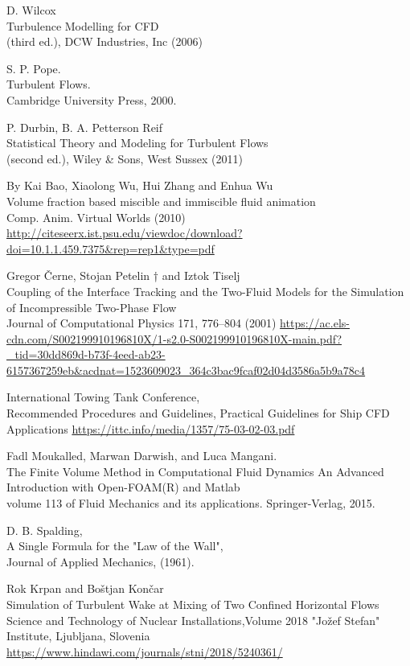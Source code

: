 \documentclass[a4paper, 12pt]{report}
\begin{document}
\begin{thebibliography}{9}
	 D. Wilcox\\
	 Turbulence Modelling for CFD\\
	(third ed.), DCW Industries, Inc (2006)
	
	S. P. Pope.\\
	Turbulent Flows.\\
	Cambridge University Press, 2000.

	 P. Durbin, B. A. Petterson Reif\\
	 Statistical Theory and Modeling for Turbulent Flows\\
	(second ed.), Wiley \& Sons, West Sussex (2011)
	
	By Kai Bao, Xiaolong Wu, Hui Zhang and Enhua Wu\\
	Volume fraction based miscible and immiscible fluid animation\\
	Comp. Anim. Virtual Worlds (2010)
	\url{http://citeseerx.ist.psu.edu/viewdoc/download?doi=10.1.1.459.7375&rep=rep1&type=pdf}
	
	Gregor Černe, Stojan Petelin † and Iztok Tiselj\\
	Coupling of the Interface Tracking and the Two-Fluid Models 		for the Simulation of Incompressible Two-Phase Flow\\
	Journal of Computational Physics 171, 776–804 (2001)
	\url{https://ac.els-cdn.com/S002199910196810X/1-s2.0-S002199910196810X-main.pdf?_tid=30dd869d-b73f-4eed-ab23-6157367259eb&acdnat=1523609023_364c3bac9fcaf02d04d3586a5b9a78c4}
	
	International Towing Tank Conference,\\
	Recommended Procedures and Guidelines, Practical Guidelines for Ship CFD Applications
	\url{https://ittc.info/media/1357/75-03-02-03.pdf}
	
	Fadl Moukalled, Marwan Darwish, and Luca Mangani.\\
	The Finite Volume Method in Computational Fluid Dynamics An Advanced Introduction with 	Open-FOAM(R) and Matlab\\
	volume 113 of Fluid Mechanics and its applications. Springer-Verlag, 2015.
	
	D. B. Spalding,\\
	A Single Formula for the "Law of the Wall",\\ 
	Journal of Applied Mechanics, (1961).
	
	Rok Krpan and Boštjan Končar\\
	Simulation of Turbulent Wake at Mixing of Two Confined Horizontal Flows
	Science and Technology of Nuclear Installations,Volume 2018 "Jožef Stefan" Institute, 		Ljubljana, Slovenia
	\url{https://www.hindawi.com/journals/stni/2018/5240361/}\\
	

\end{thebibliography}
\end{document}
